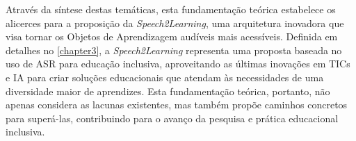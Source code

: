 Através da síntese destas temáticas, esta fundamentação teórica estabelece os alicerces para a proposição da \textit{Speech2Learning}, uma arquitetura inovadora que visa tornar os Objetos de Aprendizagem audíveis mais acessíveis. Definida em detalhes no \autoref{chapter3}, a \textit{Speech2Learning} representa uma proposta baseada no uso de ASR para educação inclusiva, aproveitando as últimas inovações em TICs e IA para criar soluções educacionais que atendam às necessidades de uma diversidade maior de aprendizes. Esta fundamentação teórica, portanto, não apenas considera as lacunas existentes, mas também propõe caminhos concretos para superá-las, contribuindo para o avanço da pesquisa e prática educacional inclusiva.